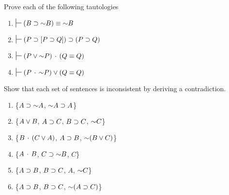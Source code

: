 {\begin{enumerate}[label=(\arabic*)]
\end{enumerate}


\noindent\problempart
Prove each of the following tautologies
\begin{enumerate}[label=(\arabic*)]
\item $\sststile{}{} (B \eif \enot B) \eiff \enot B$


\item $\sststile{}{} (P \eif [P \eif Q]) \eif (P \eif Q)$ %

\item $\sststile{}{} (P \eor \enot P) \eand (Q \eiff Q) $ %

\item $\sststile{}{} (P \eand \enot P) \eor  (Q \eiff Q)$%

\end{enumerate}

\noindent\problempart   
\label{pr.derivation.inconsistent}
Show that each set of sentences is inconsistent by deriving a contradiction.
\begin{enumerate}
\item \{$A \supset \mathord{\sim} A$, $\mathord{\sim} A \supset A$\}\vspace{.5ex} %
\item \{$A \vee B$, $A \supset C$, $B \supset C$, $\mathord{\sim} C$\}\vspace{.5ex} %
\item \{$B\,\cdot\,(C\vee A)$, $A\supset B$, $\mathord{\sim}(B\vee C)$\}\vspace{.5ex}  %
\item \{$A \,\cdot\, B$, $C\supset \mathord{\sim} B$, $C$\} \vspace{.5ex} %
\item \{$A\supset B$, $B\supset C$, $A$, $\mathord{\sim} C$\}\vspace{.5ex} %
\item \{$A \supset B$, $B \supset C$, $\mathord{\sim}(A \supset C)$\} \vspace{.5ex} %
\end{enumerate}



}
